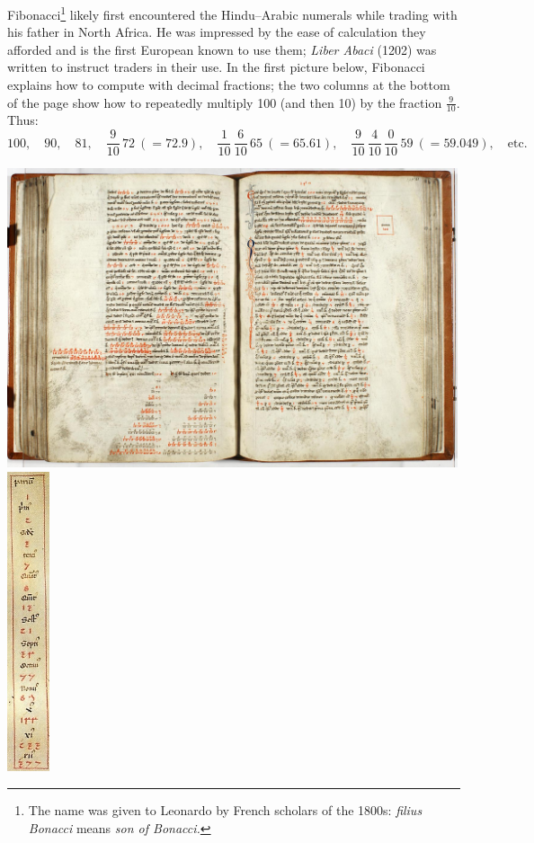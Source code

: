 Fibonacci\footnote{The name was given to Leonardo by French scholars of the 1800s: \emph{filius Bonacci} means \emph{son of Bonacci.}} likely first encountered the Hindu--Arabic numerals while trading with his father in North Africa. He was impressed by the ease of calculation they afforded and is the first European known to use them; \emph{Liber Abaci} (1202) was written to instruct traders in their use. In the first picture below, Fibonacci explains how to compute with decimal fractions; the two columns at the bottom of the page show how to repeatedly multiply 100 (and then 10) by the fraction $\frac 9{10}$. Thus:
\[100,\quad 90,\quad 81,\quad \frac 9{10}\, 72\ (=72.9),\quad \frac 1{10}\,\frac 6{10}\,65\ (=65.61),\quad\frac 9{10}\,\frac 4{10}\,\frac 0{10}\,59\ (=59.049),\quad\text{etc.}\]
\begin{center}
\includegraphics[height=250pt]{liberabaci3}
\quad
\includegraphics[height=250pt]{liberabaci1}
\end{center}
